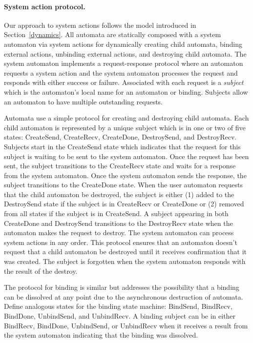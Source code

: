 \paragraph{System action protocol.}
Our approach to system actions follows the model introduced in Section~\ref{dynamics}.
All automata are statically composed with a system automaton via system actions for dynamically creating child automata, binding external actions, unbinding external actions, and destroying child automata.
The system automaton implements a request-response protocol where an automaton requests a system action and the system automaton processes the request and responds with either success or failure.
Associated with each request is a \emph{subject} which is the automaton's local name for an automaton or binding.
Subjects allow an automaton to have multiple outstanding requests.

Automata use a simple protocol for creating and destroying child automata.
Each child automaton is represented by a unique subject which is in one or two of five states: CreateSend, CreateRecv, CreateDone, DestroySend, and DestroyRecv.
Subjects start in the CreateSend state which indicates that the request for this subject is waiting to be sent to the system automaton.
Once the request has been sent, the subject transitions to the CreateRecv state and waits for a response from the system automaton.
Once the system automaton sends the response, the subject transitions to the CreateDone state.
When the user automaton requests that the child automaton be destroyed, the subject is either (1) added to the DestroySend state if the subject is in CreateRecv or CreateDone or (2) removed from all states if the subject is in CreateSend.
A subject appearing in both CreateDone and DestroySend transitions to the DestroyRecv state when the automaton makes the request to destroy.
The system automaton can process system actions in any order.
This protocol ensures that an automaton doesn't request that a child automaton be destroyed until it receives confirmation that it was created.
The subject is forgotten when the system automaton responds with the result of the destroy.

The protocol for binding is similar but addresses the possibility that a binding can be dissolved at any point due to the asynchronous destruction of automata.
Define analogous states for the binding state machine: BindSend, BindRecv, BindDone, UnbindSend, and UnbindRecv.
A binding subject can be in either BindRecv, BindDone, UnbindSend, or UnbindRecv when it receives a result from the system automaton indicating that the binding was dissolved.

